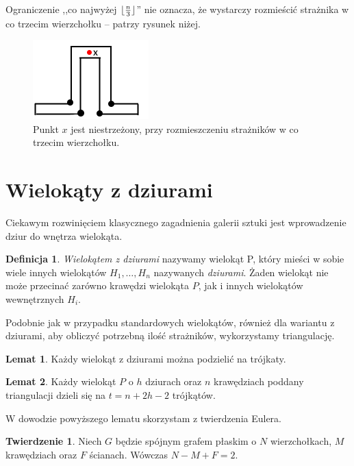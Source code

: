 \documentclass[brudnopis]{xmgr}
\DeclarePairedDelimiter\floor{\lfloor}{\rfloor}
\theoremstyle{definition}
\newtheorem{Twierdzenie}{Twierdzenie}
\newtheorem{Lemat}{Lemat}
\newtheorem{Definicja}{Definicja}
\begin{document}
\indent Ograniczenie ,,co najwyżej $\floor{\frac{n}{3}}$'' nie oznacza, że wystarczy rozmieścić strażnika w co trzecim wierzchołku -- patrzy rysunek niżej.
\begin{figure}[ht!]
  \centering
  \includegraphics{rysunki/co_trzeci.png}
  \caption{Punkt $x$ jest niestrzeżony, przy rozmieszczeniu strażników w co trzecim wierzchołku.}
\end{figure} 

\section{Wielokąty z dziurami}
Ciekawym rozwinięciem klasycznego zagadnienia galerii sztuki jest wprowadzenie dziur do wnętrza wielokąta.

\begin{Definicja} \label{def wielokat z dziurami}
  \emph{Wielokątem z dziurami} nazywamy wielokąt P, który mieści w sobie wiele innych wielokątów $H_1, \ldots, H_n$ nazywanych \emph{dziurami}. Żaden wielokąt nie może przecinać zarówno krawędzi wielokąta $P$, jak i innych wielokątów wewnętrznych $H_i$.
\end{Definicja}

\indent Podobnie jak w przypadku standardowych wielokątów, również dla wariantu z dziurami, aby obliczyć potrzebną ilość strażników, wykorzystamy triangulację.

\begin{Lemat} \cite{orourke}
  Każdy wielokąt z dziurami można podzielić na trójkaty.
\end{Lemat}

\begin{Lemat}\label{t trójkątów triangulacja} \cite{orourke}
  Każdy wielokąt $P$ o $h$ dziurach oraz $n$ krawędziach poddany triangulacji dzieli się na $t = n + 2h - 2$ trójkątów.
\end{Lemat}

W dowodzie powyższego lematu skorzystam z twierdzenia Eulera.
\begin{Twierdzenie} \label{tw eulera} \cite{euler}
  Niech $G$ będzie spójnym grafem płaskim o $N$ wierzchołkach, $M$ krawędziach oraz $F$ ścianach. Wówczas $N - M + F = 2$.
\end{Twierdzenie}
\end{document}
